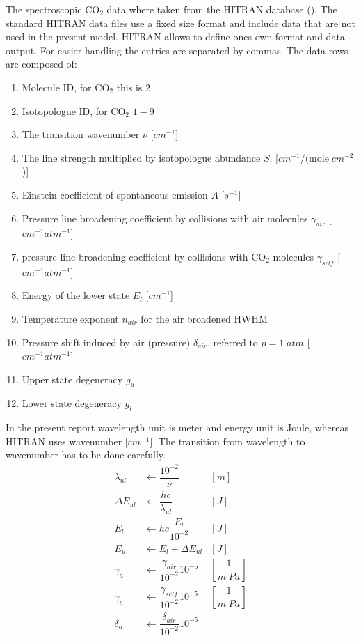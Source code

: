 The spectroscopic $\mathrm{CO}_2$ data where taken from the HITRAN database (\cite{hitran1}). The standard HITRAN data files use a fixed size format and include data that are not used in the present model. HITRAN allows to define ones own format and data output. For easier handling the entries are separated by commas. The data rows are composed of:
\begin{enumerate}
	\item Molecule ID, for $\mathrm{CO}_2$ this is $2$
 	\item Isotopologue ID, for $\mathrm{CO}_2$ $1-9$
 	\item The transition wavenumber $\nu$	[$cm^{-1}$]
    \item The line strength multiplied by isotopologue abundance $S$, [$cm^{-1}/(\mathrm{mole} \;cm^{-2}$)]
 	\item Einstein coefficient of spontaneous emission $A$ [$s^{-1}$]
 	\item Pressure line broadening coefficient by collisions with air molecules $\gamma_{air}$ [$cm^{-1} atm^{-1}$]
 	\item pressure line broadening coefficient by collisions with $\mathrm{CO}_2$ molecules $\gamma_{self}$ [$cm^{-1} atm^{-1}$]
	\item Energy of the lower state $E_l$ [$cm^{-1}$]
	\item Temperature exponent $n_{air}$ for the air broadened HWHM
	\item Pressure shift induced by air (pressure) $\delta_{air}$, referred to $p = 1\; atm$ [$cm^{-1} atm^{-1}$]
	\item Upper state degeneracy $g_u$
	\item Lower state degeneracy $g_l$
\end{enumerate}
In the present report wavelength unit is meter and energy unit is Joule, whereas HITRAN uses wavenumber [$cm^{-1}$]. The transition from wavelength to wavenumber has to be done carefully.
\begin{align*}
	\lambda_{ul}     & \leftarrow \dfrac{10^{-2}}{\nu}               & [m]                   \\
	\Delta E_{ul}    & \leftarrow \dfrac{h  c}{\lambda_{ul}}         & [J]                   \\
 	E_l              & \leftarrow h  c  \dfrac{E_l}{10^{-2}}         & [J]                   \\
	E_u              & \leftarrow E_l + \Delta E_{ul}                  & [J]                   \\
	\gamma_a         & \leftarrow \dfrac{\gamma_{air}}{10^{-2}}  10^{-5} & \left[\dfrac{1}{m \; Pa}\right] \\
	\gamma_s         & \leftarrow \dfrac{\gamma_{self}}{10^{-2}}  10^{-5} & \left[\dfrac{1}{m \; Pa}\right] \\
	\delta_a         & \leftarrow \dfrac{\delta_{air}}{10^{-2}}  10^{-5} &
\end{align*}

